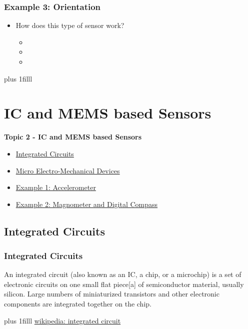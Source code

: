 \documentclass[fleqn]{beamer} %
\newcommand{\sectionIItitle}{IC and MEMS based Sensors}
\newcommand{\sectionIsubsectionIVtitle}{Example 3: Orientation}
\newcommand{\sectionIIsubsectionItitle}{Integrated Circuits}
\newcommand{\sectionIIsubsectionIItitle}{Micro Electro-Mechanical Devices}
\newcommand{\sectionIIsubsectionIIItitle}{Example 1: Accelerometer}
\newcommand{\sectionIIsubsectionIVtitle}{Example 2: Magnometer and Digital Compass}
\newcommand{\btVFill}{\vskip0pt plus 1filll}
\begin{document}
			\begin{frame}
				\frametitle{\sectionIsubsectionIVtitle}
				\begin{itemize}
					\item How does this type of sensor work?
					\begin{itemize}
						\item \vspace{5mm}
						\item \vspace{5mm}
						\item \vspace{5mm}	
					\end{itemize}
				\end{itemize}
				
				\btVFill

			\end{frame}

	
	\section{\sectionIItitle}\label{sectionII}

		\begin{frame}
			\large \textbf{Topic 2 - \sectionIItitle} \vspace{3mm}\\

			\begin{itemize}
				\item \hyperlink{sectionIIsubsectionI}{\sectionIIsubsectionItitle} \vspc %
				\item \hyperlink{sectionIIsubsectionII}{\sectionIIsubsectionIItitle} \vspc %
				\item \hyperlink{sectionIIsubsectionIII}{\sectionIIsubsectionIIItitle} \vspc %
				\item \hyperlink{sectionIIsubsectionIV}{\sectionIIsubsectionIVtitle} \vspc %
			\end{itemize}

		\end{frame}

		\subsection{\sectionIIsubsectionItitle}\label{sectionIIsubsectionI}

			\begin{frame}[label=sectionIIsubsectionI]
				\frametitle{\sectionIIsubsectionItitle}

				An integrated circuit (also known as an IC, a chip, or a microchip) is a set of electronic circuits on one small flat piece[a] of semiconductor material, usually silicon. Large numbers of miniaturized transistors and other electronic components are integrated together on the chip.	

				\btVFill
				{\tiny\href{https://en.wikipedia.org/wiki/Integrated_circuit}{wikipedia: integrated circuit}}
				
			\end{frame}	
\end{document}
